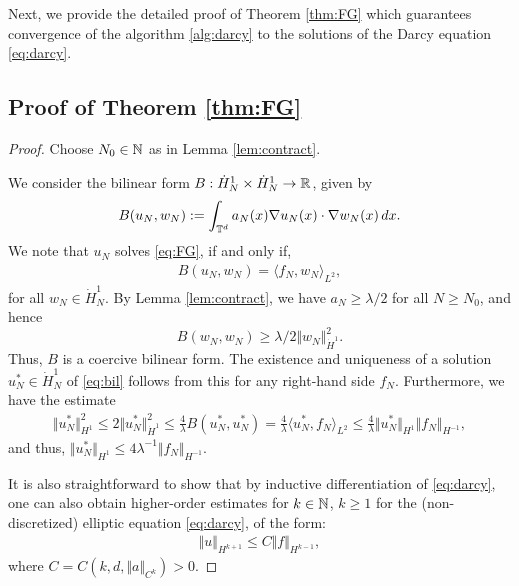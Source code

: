 \documentclass[reqno,a4paper]{amsart}
\begin{document}
Next, we provide the detailed proof of Theorem \ref{thm:FG} which guarantees convergence of the algorithm \ref{alg:darcy} to the solutions of the Darcy equation \eqref{eq:darcy}.
\subsection{Proof of Theorem \ref{thm:FG}} 
\label{app:FG}

\begin{proof}
Choose $N_0\in \mathbb{N}$ as in Lemma \ref{lem:contract}. 


We consider the bilinear form $B: \dot{H}^1_N \times \dot{H}^1_N \to \mathbb{R}$, given by 
\[
B(u_N, w_N) 
:=
\int_{\mathbb{T}^d} a_N(x) \nabla u_N(x) \cdot \nabla w_N(x) \, dx.
\]
We note that $u_N$ solves \eqref{eq:FG}, if and only if, 
\begin{align}\label{eq:bil}
B(u_N, w_N) = \langle f_N, w_N \rangle_{L^2},
\end{align}
for all $w_N \in \dot{H}^1_N$. By Lemma \ref{lem:contract}, we have $a_N \ge \lambda/2$ for all $N\ge N_0$, and hence
\[
B(w_N, w_N) \ge \lambda/2 \Vert w_N \Vert_{\dot{H}^1}^2. 
\]
Thus, $B$ is a coercive bilinear form. The existence and uniqueness of a solution $u_N^\ast \in \dot{H}^1_N$ of \eqref{eq:bil} follows from this for any right-hand side $f_N$. Furthermore, we have the estimate
\begin{align*}
\Vert u_N^\ast \Vert_{H^1}^2
\le
2\Vert u_N^\ast \Vert_{\dot{H}^1}^2
\le
\frac{4}{\lambda} B(u_N^\ast,u_N^\ast)
=
\frac{4}{\lambda}\langle u_N^\ast, f_N \rangle_{L^2}
\le
\frac{4}{\lambda}\Vert u_N^\ast \Vert_{{H}^1} \Vert f_N \Vert_{{H}^{-1}},
\end{align*}
and thus, $\Vert u_N^\ast \Vert_{{H}^1} \le 4\lambda^{-1} \Vert f_N \Vert_{{H}^{-1}}$.

It is also straightforward to show that by inductive differentiation of \eqref{eq:darcy}, one can also obtain higher-order estimates for $k\in \mathbb{N}$, $k\ge 1$ for the (non-discretized) elliptic equation \eqref{eq:darcy}, of the form:
\begin{align} \label{eq:reg}
\Vert u \Vert_{H^{k+1}} \le C \Vert f \Vert_{H^{k-1}},
\end{align}
where $C = C(k,d,\Vert a \Vert_{C^k})>0$.


\end{proof}
\end{document}
